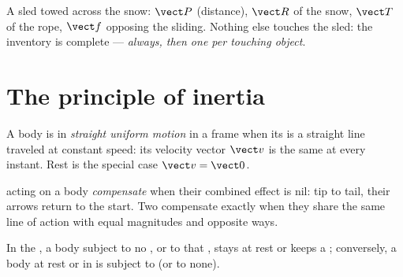 \begin{example}\label{ex:g10:inertia:sled}
A sled towed across the snow:  $\vect P$ (distance),  $\vect R$ of the snow,  $\vect T$ of the rope, 
$\vect f$ opposing the sliding. Nothing else touches the sled: the
inventory is complete --- \emph{ always, then one 
per touching object}.
\end{example}

\section{The principle of inertia}

\begin{definition}\label{def:g10:inertia:uniform}
A body is in \emph{straight uniform motion} in a frame when its  is a straight line traveled at
constant speed: its velocity vector $\vect v$ is the same at every
instant. Rest is the special case $\vect v = \vect 0$.
\end{definition}

\begin{definition}\label{def:g10:inertia:compensate}
 acting on a body \emph{compensate}
when their combined effect is nil: tip to tail, their arrows return to
the start. Two  compensate exactly when they share the same line
of action with equal magnitudes and opposite ways.
\end{definition}

\begin{theorem}\label{thm:g10:inertia:principle}
In the , a body subject to no , or to  that
, stays at rest or keeps a ;
conversely, a body at rest or in  is subject
to  (or to none).
\end{theorem}
\admitted

